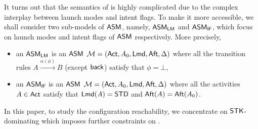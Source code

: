 

It turns out that the semantics of {\AMASS} is highly complicated due to the complex interplay between launch modes and intent flags. %
To make it more accessible, we %
shall consider two sub-models of $\textsf{ASM}$, namely, $\textsf{ASM}_\textsf{LM}$ and $\textsf{ASM}_\textsf{IF}$, which focus on launch modes and intent flags of $\textsf{ASM}$ respectively. 
More precisely, 
\begin{itemize}
	\item an $\textsf{ASM}_\textsf{LM}$ is an $\textsf{ASM}$ ${\mathcal{M} } = ({\sf Act}, A_0, {\sf Lmd}, {\sf Aft}, \Delta)$ where all the transition rules $A \xrightarrow{\alpha(\phi)} B$ (except ${\mathsf{back} }$) satisfy that $\phi = \bot$, 
	\item an $\textsf{ASM}_\textsf{IF}$ is an $\textsf{ASM}$ ${\mathcal{M} } = ({\sf Act}, A_0, {\sf Lmd}, {\sf Aft}, \Delta)$ where all the activities $A\in{\sf Act}$ satisfy that ${\sf Lmd}(A) = \mathsf{STD}$ and ${\sf Aft}(A) = {\sf Aft}(A_0)$.
\end{itemize}



	


%
In this paper, to study the configuration reachability, we %
concentrate on $\mathsf{STK}$-dominating {\AMASS} which imposes further constraints on {\AMASS}. %
	
	
